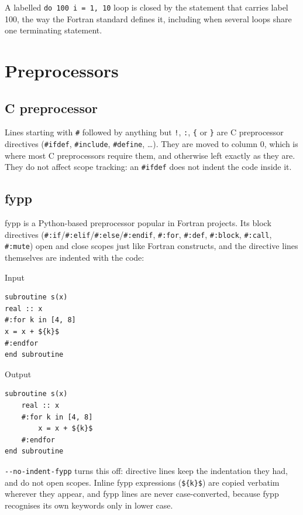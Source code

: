 \documentclass[11pt,a4paper,openany]{book}
\newcommand{\code}[1]{\texttt{\small #1}}
\newcommand{\flag}[1]{\texttt{\small -{}-#1}}
\newenvironment{beforecol}{\noindent\begin{minipage}[t]{0.485\linewidth}\textsf{\footnotesize\color{commentc}Input}}{\end{minipage}\hfill}
\newenvironment{aftercol}{\begin{minipage}[t]{0.485\linewidth}\textsf{\footnotesize\color{commentc}Output}}{\end{minipage}\par\medskip}
\begin{document}
A labelled \code{do 100 i = 1, 10} loop is closed by the statement that carries
label 100, the way the Fortran standard defines it, including when several
loops share one terminating statement.

\section{Preprocessors}

\subsection{C preprocessor}

Lines starting with \code{\#} followed by anything but \code{!}, \code{:},
\code{\{} or \code{\}} are C preprocessor directives (\code{\#ifdef},
\code{\#include}, \code{\#define}, \ldots). They are moved to column 0, which
is where most C preprocessors require them, and otherwise left exactly as they
are. They do not affect scope tracking: an \code{\#ifdef} does not indent the
code inside it.

\subsection{fypp}

fypp is a Python-based preprocessor popular in Fortran projects. Its block
directives (\code{\#:if}/\code{\#:elif}/\code{\#:else}/\code{\#:endif},
\code{\#:for}, \code{\#:def}, \code{\#:block}, \code{\#:call},
\code{\#:mute}) open and close scopes just like Fortran constructs, and the
directive lines themselves are indented with the code:

\begin{beforecol}
\begin{lstlisting}[style=before]
subroutine s(x)
real :: x
#:for k in [4, 8]
x = x + ${k}$
#:endfor
end subroutine
\end{lstlisting}
\end{beforecol}
\begin{aftercol}
\begin{lstlisting}[style=after]
subroutine s(x)
    real :: x
    #:for k in [4, 8]
        x = x + ${k}$
    #:endfor
end subroutine
\end{lstlisting}
\end{aftercol}

\flag{no-indent-fypp} turns this off: directive lines keep the indentation they
had, and do not open scopes. Inline fypp expressions
(\code{\$\{k\}\$}) are copied verbatim wherever they appear, and fypp lines are
never case-converted, because fypp recognises its own keywords only in lower
case.
\end{document}
